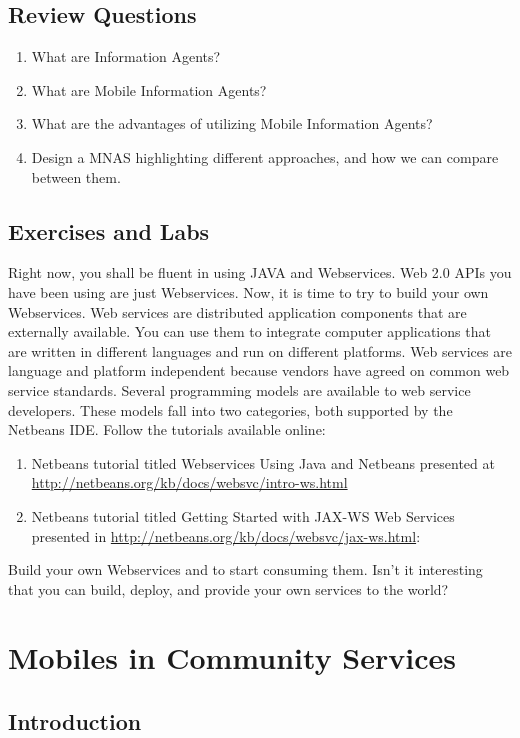 \documentclass[12pt,a4paper,final,twoside,onecolumn,titlepage]{book}
\begin{document}
\section{Review Questions}
\begin{enumerate}
\item What are Information Agents?
\item What are Mobile Information Agents?
\item What are the advantages of utilizing Mobile Information Agents?
\item Design a \gls{MNAS} highlighting different approaches, and how we can compare between them.
\end{enumerate}

\section{Exercises and Labs}
Right now, you shall be fluent in using JAVA and Webservices. Web 2.0 APIs you have been using are just Webservices. Now, it is time to try to build your own Webservices. Web services are distributed application components that are externally available. You can use them to integrate computer applications that are written in different languages and run on different platforms. Web services are language and platform independent because vendors have agreed on common web service standards.
Several programming models are available to web service developers. These models fall into two categories, both supported by the Netbeans IDE. Follow the tutorials available online:
\begin{enumerate}
\item  Netbeans tutorial titled Webservices Using Java and Netbeans presented at \url{http://netbeans.org/kb/docs/websvc/intro-ws.html}
\item Netbeans tutorial titled Getting Started with JAX-WS Web Services presented in \url{ http://netbeans.org/kb/docs/websvc/jax-ws.html}:
\end{enumerate}
Build your own Webservices and to start consuming them. Isn't it interesting that you can build, deploy, and provide your own services to the world?

\chapter{Mobiles in Community Services}
\label{Sanay3y}
\section{Introduction}
\end{document}
